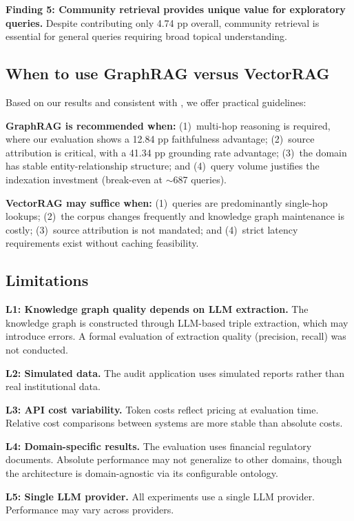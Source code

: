 \documentclass[review]{elsarticle}
\begin{document}
\textbf{Finding 5: Community retrieval provides unique value for exploratory queries.} Despite contributing only 4.74 pp overall, community retrieval is essential for general queries requiring broad topical understanding.


\subsection{When to use GraphRAG versus VectorRAG}
\label{sec:disc-when}

Based on our results and consistent with \citet{whenusegraphs2025}, we offer practical guidelines:

\textbf{GraphRAG is recommended when:} (1)~multi-hop reasoning is required, where our evaluation shows a 12.84 pp faithfulness advantage; (2)~source attribution is critical, with a 41.34 pp grounding rate advantage; (3)~the domain has stable entity-relationship structure; and (4)~query volume justifies the indexation investment (break-even at $\sim$687 queries).

\textbf{VectorRAG may suffice when:} (1)~queries are predominantly single-hop lookups; (2)~the corpus changes frequently and knowledge graph maintenance is costly; (3)~source attribution is not mandated; and (4)~strict latency requirements exist without caching feasibility.


\subsection{Limitations}
\label{sec:disc-limitations}

\textbf{L1: Knowledge graph quality depends on LLM extraction.} The knowledge graph is constructed through LLM-based triple extraction, which may introduce errors. A formal evaluation of extraction quality (precision, recall) was not conducted.

\textbf{L2: Simulated data.} The audit application uses simulated reports rather than real institutional data.

\textbf{L3: API cost variability.} Token costs reflect pricing at evaluation time. Relative cost comparisons between systems are more stable than absolute costs.

\textbf{L4: Domain-specific results.} The evaluation uses financial regulatory documents. Absolute performance may not generalize to other domains, though the architecture is domain-agnostic via its configurable ontology.

\textbf{L5: Single LLM provider.} All experiments use a single LLM provider. Performance may vary across providers.
\end{document}
